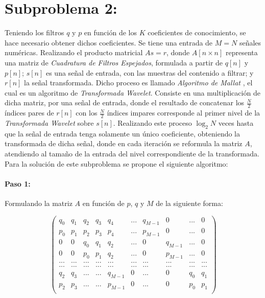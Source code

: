 \documentclass[11pt]{article}
\begin{document}
\section*{Subproblema 2:}
Teniendo los filtros \(q\) y \(p\) en función de los \(K\) coeficientes de conocimiento, se hace necesario obtener dichos coeficientes. Se tiene una entrada de \(M = N\) 
señales numéricas. Realizando el producto matricial \(As = r\), donde \(A[n \times n]\) representa una matriz de {\it Cuadratura de Filtros Espejados}, formulada a partir de 
\(q[n]\) y \(p[n]\); \(s[n]\) es una señal de entrada, con las muestras del contenido a filtrar; y \(r[n]\) la señal transformada. Dicho proceso es llamado {\it Algoritmo 
de Mallat} \cite{mallat}, el cual es un algoritmo de {\it Transformada Wavelet}. Consiste en una multiplicación de dicha matriz, por una señal de entrada, donde el resultado de concatenar 
los \(\frac{N}{2}\) índices pares de \(r[n]\) con los \(\frac{N}{2}\) índices impares corresponde al primer nivel de la {\it Transformada Wavelet} sobre \(s[n]\). Realizando este proceso \(\log_{2}{N}\) 
veces hasta que la señal de entrada tenga solamente un único coeficiente, obteniendo la transformada de dicha señal, donde en cada iteración se reformula la matriz \(A\), atendiendo al tamaño de la entrada 
del nivel correspondiente de la transformada. Para la solución de este subproblema se propone el siguiente algoritmo:


\paragraph*{Paso 1:}
Formulando la matriz \(A\) en función de \(p\), \(q\) y \(M\) de la siguiente forma:

\begin{equation}
    \begin{pmatrix}
        q_0 & q_1 & q_2 & q_3 & q_4 & ... & q_{M - 1} & 0 & ... & 0\\ 
        p_0 & p_1 & p_2 & p_3 & p_4 & ... & p_{M - 1} & 0 & ... & 0\\ 
        0 & 0 & q_0 & q_1 & q_2 & ... & 0 & q_{M - 1} & ... & 0\\ 
        0 & 0 & p_0 & p_1 & q_2 & ... & 0 & p_{M - 1} & ... & 0\\ 
        ... & ... & ... & ... & ... & ... & ... & ... & ... & ...\\
        ... & ... & ... & ... & ... & ... & ... & ... & ... & ...\\
        q_2 & q_3 & ... & ... & q_{M - 1} & 0 &... & 0 & q_0 & q_1\\
        p_2 & p_3 & ... & ... & p_{M - 1} & 0 &... & 0 & p_0 & p_1\\
    \end{pmatrix}
\end{equation}
\end{document}
